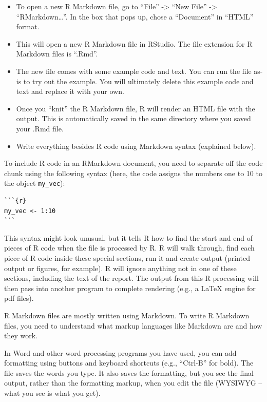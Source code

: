 \documentclass[]{tufte-book}
\providecommand{\tightlist}{%
  \setlength{\itemsep}{0pt}\setlength{\parskip}{0pt}}
\begin{document}
\begin{itemize}
\tightlist
\item
  To open a new R Markdown file, go to ``File'' -\textgreater{} ``New File'' -\textgreater{} ``RMarkdown\ldots{}''. In the
  box that pops up, chose a ``Document'' in ``HTML'' format.
\item
  This will open a new R Markdown file in RStudio. The file extension for R Markdown files is ``.Rmd''.
\item
  The new file comes with some example code and text. You can run the file as-is to try out the example.
  You will ultimately delete this example code and text and replace it with your own.
\item
  Once you ``knit'' the R Markdown file, R will render an HTML file with the output. This is automatically
  saved in the same directory where you saved your .Rmd file.
\item
  Write everything besides R code using Markdown syntax (explained below).
\end{itemize}

To include R code in an RMarkdown document, you need to separate off the code chunk using the
following syntax (here, the code assigns the numbers one to 10 to the object \texttt{my\_vec}):

\begin{verbatim}
```{r}
my_vec <- 1:10
```
\end{verbatim}

This syntax might look unusual, but it tells R how to find the start and end of pieces of R code
when the file is processed by R. R will walk through, find each piece of R code inside these
special sections, run it and create
output (printed output or figures, for example). R will ignore anything not in one of these
sections, including the text of the report.
The output from this R processing will then pass into another program to complete
rendering (e.g., a LaTeX engine for pdf files).

R Markdown files are mostly written using Markdown. To write R Markdown files, you need to understand
what markup languages like Markdown are and how they work.

In Word and other word processing programs you have used, you can add formatting using buttons and
keyboard shortcuts (e.g., ``Ctrl-B'' for bold). The file saves the words you type. It also saves the
formatting, but you see the final output, rather than the formatting markup, when you edit the file
(WYSIWYG -- what you see is what you get).
\end{document}
